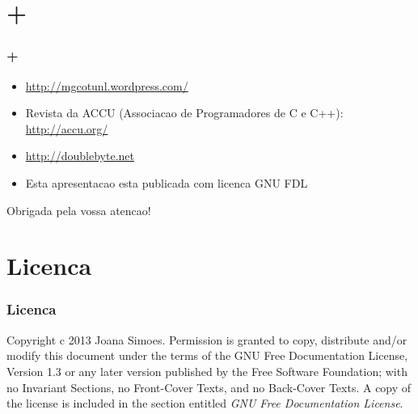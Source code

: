 \documentclass[hyperref={pdfpagelabels=true}]{beamer}
\begin{document}
\section{+}
\begin{frame}
\frametitle{+}

\begin{itemize}
\item<1-> \url{http://mgcotunl.wordpress.com/}
\item<1-> Revista da ACCU (Associacao de Programadores de C e C++): \url{http://accu.org/}
\item<1-> \url{http://doublebyte.net}
\item<1-> Esta apresentacao esta publicada com licenca GNU FDL
\end{itemize}
\pause
\vspace{1cm}
\huge
Obrigada pela vossa atencao!
\end{frame}

\section{Licenca}
\begin{frame}
\frametitle{Licenca}
Copyright c 2013 Joana Simoes. Permission is granted
to copy, distribute and/or modify this document under
the terms of the GNU Free Documentation License,
Version 1.3 or any later version published by the Free
Software Foundation; with no Invariant Sections, no
Front-Cover Texts, and no Back-Cover Texts. A copy of
the license is included in the section entitled \textit{GNU Free
Documentation License}.
\end{frame}


\end{document}
